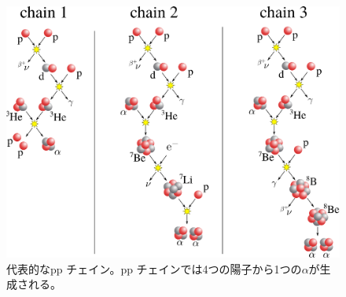 \begin{figure}
  \centering
  \includegraphics[clip, width=0.9\columnwidth]{eps/pp_chain.eps}
  \caption{代表的なpp チェイン。pp チェインでは4つの陽子から1つの$\alpha$が生成される。}
  \label{fig::pp_chain}
\end{figure}


